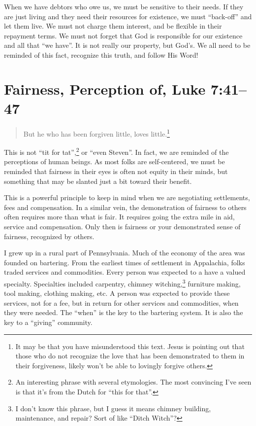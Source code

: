 \documentclass[12pt]{memoir}
\begin{document}
When we have debtors who owe us, we must be sensitive to their needs.
If they are just living and they need their resources for existence,
we must ``back-off'' and let them live. We must not charge them
interest, and be flexible in their repayment terms. We must not forget
that God is responsible for our existence and all that ``we have''.
It is not really our property, but God's. We all need to be reminded
of this fact, recognize this truth, and follow His Word!

\section[Fairness, Perception of]{Fairness, Perception of, Luke 7:41--47}

\begin{quote}
But he who has been forgiven little, loves little.\footnote{It may be that you have misunderstood this text. Jesus is pointing out that those who do not recognize the love that has been demonstrated to them in their forgiveness, likely won't be able to lovingly forgive others.}
\end{quote}

This is not ``tit for tat'',\footnote{An interesting phrase with several etymologies. The most convincing I've seen is that it's from the Dutch for ``this for that''.} or ``even Steven''. In fact, we are reminded of the perceptions of human beings. As most folks are self-centered, we must be reminded that fairness in their eyes is often not equity in their minds, but something that may be slanted just a bit toward their benefit.

This is a powerful principle to keep in mind when we are negotiating settlements, fees and compensation. In a similar vein, the demonstration of fairness to others often requires more than what is fair. It requires going the extra mile in aid, service and compensation. Only then is fairness or your demonstrated sense of fairness, recognized by others.

I grew up in a rural part of Pennsylvania. Much of the economy of
the area was founded on bartering. From the earliest times of settlement in Appalachia, folks traded services and commodities. Every
person was expected to a have a valued specialty. Specialties
included carpentry, chimney witching,\footnote{I don't know this phrase, but I guess it means chimney building, maintenance, and repair? Sort of like ``Ditch Witch''?} furniture making, tool making,
clothing making, etc. A person was expected to provide these services,
not for a fee, but in return for other services and commodities, when
they were needed. The ``when'' is the key to the bartering system. It is also the key to a ``giving'' community. 
\end{document}
